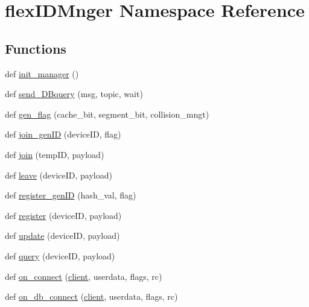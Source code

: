 \hypertarget{namespaceflexIDMnger}{}\section{flex\+I\+D\+Mnger Namespace Reference}
\label{namespaceflexIDMnger}
\subsection*{Functions}
\begin{DoxyCompactItemize}
\item 
def \hyperlink{namespaceflexIDMnger_a652a7bbc0ce6a1a608f6161092ccaf0b}{init\+\_\+manager} ()
\item 
def \hyperlink{namespaceflexIDMnger_ab0d711eb10db1022c77f0b2b8dbddf0a}{send\+\_\+\+D\+Bquery} (msg, topic, wait)
\item 
def \hyperlink{namespaceflexIDMnger_ab63851993ef0e716a311a266b148f40a}{gen\+\_\+flag} (cache\+\_\+bit, segment\+\_\+bit, collision\+\_\+mngt)
\item 
def \hyperlink{namespaceflexIDMnger_a7bf5319f433d75d5f7a3d29ea46c61b0}{join\+\_\+gen\+ID} (device\+ID, flag)
\item 
def \hyperlink{namespaceflexIDMnger_a254360eeaead4225f59b589292545e92}{join} (temp\+ID, payload)
\item 
def \hyperlink{namespaceflexIDMnger_ad8bef091b94d947a722b85cc02983b3b}{leave} (device\+ID, payload)
\item 
def \hyperlink{namespaceflexIDMnger_a08a046d2b95cf1363e51486565e8e484}{register\+\_\+gen\+ID} (hash\+\_\+val, flag)
\item 
def \hyperlink{namespaceflexIDMnger_ac5207b0e188d32e0f6fbc53be7c1a4c7}{register} (device\+ID, payload)
\item 
def \hyperlink{namespaceflexIDMnger_aba39b4b12e83409d89e6557292a69101}{update} (device\+ID, payload)
\item 
def \hyperlink{namespaceflexIDMnger_a45402acfbbc4327962abde9dd6fec0f4}{query} (device\+ID, payload)
\item 
def \hyperlink{namespaceflexIDMnger_a54f6e56e90d3f6fdb1c031397e385256}{on\+\_\+connect} (\hyperlink{namespaceflexIDMnger_a14d9378e3d8a87b7ff6a7dad2fd1b6c6}{client}, userdata, flags, rc)
\item 
def \hyperlink{namespaceflexIDMnger_aa83a4c45a3078be5a5538e4c0ee7e688}{on\+\_\+db\+\_\+connect} (\hyperlink{namespaceflexIDMnger_a14d9378e3d8a87b7ff6a7dad2fd1b6c6}{client}, userdata, flags, rc)
\item 

\end{DoxyCompactItemize}

